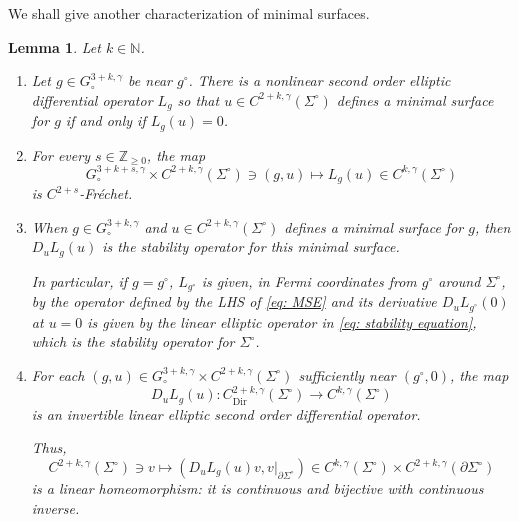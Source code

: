 \documentclass[11pt]{amsart}
\newtheorem{Lemma}[Theorem]{Lemma}
\theoremstyle{definition}
\numberwithin{equation}{section}
\begin{document}
We shall give another characterization of minimal surfaces.
\begin{Lemma}\label{lem:linofmin}Let $ k\in\mathbb{N}$.

	\begin{enumerate}
	\item Let $g\in G^{3+k,\gamma}_\circ$ be near $g^\circ$. There is a nonlinear second order elliptic differential operator $L_{g}$ so that $u\in C^{2+k,\gamma}(\Sigma^\circ)$ defines a minimal surface for $g$ if and only if $L_{g}(u) = 0$. 
	\item For every $s\in \mathbb{Z}_{\geq 0}$, the map
	\[
		G^{3+k+s,\gamma}_\circ\times C^{2+k,\gamma}(\Sigma^\circ) \ni (g, u) \mapsto L_{g}(u) \in C^{k,\gamma}(\Sigma^\circ)
	\]
	is $C^{2+s}$-Fr\'echet. 
	\item When $g\in G^{3+k,\gamma}_\circ$ and $u\in C^{2+k,\gamma}(\Sigma^\circ)$ defines a minimal surface for $g$, then $D_u L_{g}(u)$ is the stability operator for this minimal surface.

    In particular, if $g=g^\circ$, $L_{g^\circ}$ is given, in Fermi coordinates from $g^\circ$ around $\Sigma^\circ$, by the operator defined by the LHS of \eqref{eq: MSE} and its derivative $D_u L_{g^\circ}(0)$ at $u=0$ is given by the linear elliptic operator in \eqref{eq: stability equation}, which is the stability operator for $\Sigma^\circ$.
	\item For each $(g,u)\in G^{3+k,\gamma}_\circ\times C^{2+k,\gamma}(\Sigma^\circ)$ sufficiently near $(g^\circ,0)$, the map
	\[
		D_u L_{g}(u) \colon C^{2+k,\gamma}_{\mathrm{Dir}}(\Sigma^\circ) \to C^{k,\gamma}(\Sigma^\circ)
	\]
	is an invertible linear elliptic second order differential operator.

	Thus,
	\begin{equation}\label{eq:invbleStable}
	 C^{2+k,\gamma}(\Sigma^\circ) \ni v \mapsto (D_u L_{g}(u)v,v\vert_{\partial\Sigma^\circ}) \in C^{k,\gamma}(\Sigma^\circ)\times C^{2+k,\gamma}(\partial\Sigma^\circ)
	\end{equation}
	is a linear homeomorphism: it is continuous and bijective with continuous inverse.
\end{enumerate}
\end{Lemma}
\end{document}
